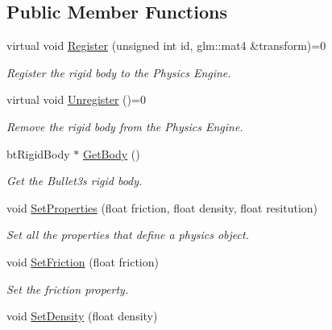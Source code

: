 \subsection*{Public Member Functions}
\begin{DoxyCompactItemize}
\item 
virtual void \hyperlink{classTarbora_1_1RigidBody_a5f41c214aabe2a7f069a317cb755f0f1}{Register} (unsigned int id, glm\+::mat4 \&transform)=0
\begin{DoxyCompactList}\small\item\em Register the rigid body to the Physics Engine. \end{DoxyCompactList}\item 
\mbox{\label{classTarbora_1_1RigidBody_a1ef83d0b9b2c9901807d584aa563dafb}} 
virtual void \hyperlink{classTarbora_1_1RigidBody_a1ef83d0b9b2c9901807d584aa563dafb}{Unregister} ()=0
\begin{DoxyCompactList}\small\item\em Remove the rigid body from the Physics Engine. \end{DoxyCompactList}\item 
\mbox{\label{classTarbora_1_1RigidBody_a84abb7801200d1c3aecbabb1ae6fff8f}} 
bt\+Rigid\+Body $\ast$ \hyperlink{classTarbora_1_1RigidBody_a84abb7801200d1c3aecbabb1ae6fff8f}{Get\+Body} ()
\begin{DoxyCompactList}\small\item\em Get the Bullet3\textquotesingle{}s rigid body. \end{DoxyCompactList}\item 
void \hyperlink{classTarbora_1_1RigidBody_a0ec675847bf2c6e5f34002eab0c29ef0}{Set\+Properties} (float friction, float density, float resitution)
\begin{DoxyCompactList}\small\item\em Set all the properties that define a physics object. \end{DoxyCompactList}\item 
void \hyperlink{classTarbora_1_1RigidBody_a9408bdeb536881e29f3706bb061220d2}{Set\+Friction} (float friction)
\begin{DoxyCompactList}\small\item\em Set the friction property. \end{DoxyCompactList}\item 
void \hyperlink{classTarbora_1_1RigidBody_a154ac3b0b5f1e6da32ee6e02b65822d8}{Set\+Density} (float density)

\end{DoxyCompactItemize}
